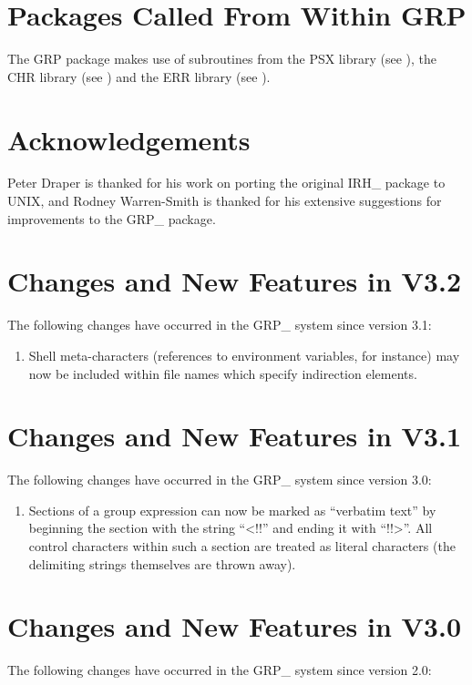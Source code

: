 \section{\label{APP:PACK}Packages Called From Within GRP}
The GRP package makes use of subroutines from the PSX
library (see ), the CHR library (see
) and the ERR library (see
).

\section{Acknowledgements}

Peter Draper is thanked for his work on porting the original IRH\_ package to
UNIX, and Rodney Warren-Smith is thanked for his extensive suggestions for
improvements to the GRP\_ package.

\section{Changes and New Features in V3.2}
The following changes have occurred in the GRP\_ system since version 3.1:

\begin{enumerate}
\item Shell meta-characters (references to environment variables, for
instance) may now be included within file names which specify
indirection elements.

\end{enumerate}

\section{Changes and New Features in V3.1}
The following changes have occurred in the GRP\_ system since version 3.0:

\begin{enumerate}

\item Sections of a group expression can now be marked as ``verbatim text''
by beginning the section with the string ``<!!'' and ending it with
``!!>''. All control characters within such a section are treated as
literal characters (the delimiting strings themselves are thrown away).
\end{enumerate}

\section{Changes and New Features in V3.0}
The following changes have occurred in the GRP\_ system since version 2.0:

